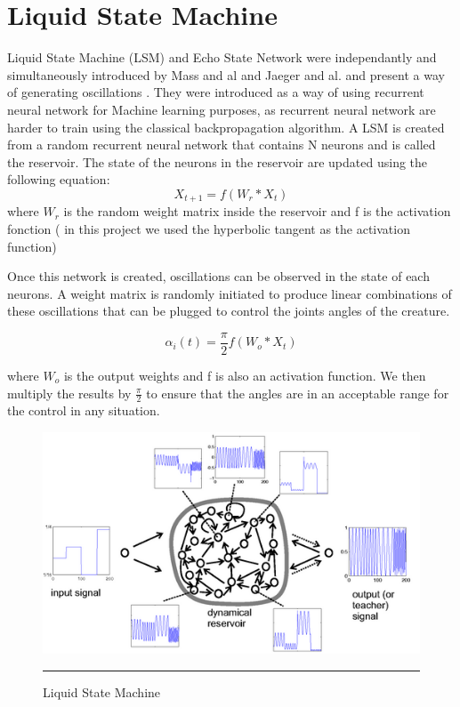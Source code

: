 \section{Liquid State Machine}

Liquid State Machine (LSM) and Echo State Network were independantly and simultaneously introduced by Mass and al \cite{liquidstatemachine} and Jaeger and al. \cite{echostatejaeger} and present a way of generating oscillations \cite{echostate}. They were introduced as a way of using recurrent neural network for Machine learning purposes, as recurrent neural network are harder to train using the classical backpropagation algorithm. A LSM is created from a random recurrent neural network that contains N neurons and is called the reservoir. The state of the neurons in the reservoir are updated using the following equation: 
\begin{equation*}
    X_{t + 1} = f( W_r * X_{t})
\end{equation*}
 where $W_r$ is the random weight matrix inside the reservoir and f is the activation fonction ( in this project we used the hyperbolic tangent as the activation function)

Once this network is created, oscillations can be observed in the state of each neurons. A weight matrix is randomly initiated to produce linear combinations of these oscillations that can be plugged to control the joints angles of the creature.

\begin{equation*}
    \alpha_i(t) = \frac{\pi}{2} f( W_o * X_{t})
\end{equation*}

where $W_o$ is the output weights and f is also an activation function. We then multiply the results by $\frac{\pi}{2}$ to ensure that the angles are in an acceptable range for the control in any situation.

\begin{figure}[htbp]
    \centering
    \includegraphics[scale=3.0]{Figures/echo_state.png}
    \rule{35em}{0.5pt}
    \caption[Liquid State Machine]{Liquid State Machine}
    \label{fig:echo_state}
\end{figure}



